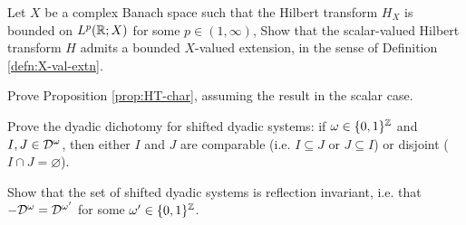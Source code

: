 \begin{exercise}
  Let $X$ be a complex Banach space such that the Hilbert transform $H_{X}$ is bounded on $L^p(\mathbb{R};X)$ for some $p \in (1,\infty)$,
  Show that the scalar-valued Hilbert transform $H$ admits a bounded $X$-valued extension, in the sense of Definition \ref{defn:X-val-extn}.
\end{exercise}

\begin{exercise}\label{ex:HT-char}
  Prove Proposition \ref{prop:HT-char}, assuming the result in the scalar case.
\end{exercise}

\begin{exercise}\label{ex:dyadic-dichotomy}
  Prove the dyadic dichotomy for shifted dyadic systems: if $\omega \in \{0,1\}^{\mathbb{Z}}$ and $I,J \in \mathcal{D}^{\omega}$, then either $I$ and $J$ are comparable (i.e. $I \subseteq J$ or $J \subseteq I$) or disjoint ($I \cap J = \varnothing$).
\end{exercise}

\begin{exercise}\label{ex:dyadic-refln-invariance}
  Show that the set of shifted dyadic systems is reflection invariant, i.e. that $-\mathcal{D}^{\omega} = \mathcal{D}^{\omega'}$ for some $\omega' \in \{0,1\}^{\mathbb{Z}}$.
\end{exercise}




